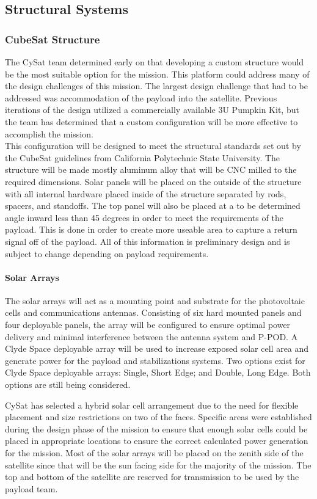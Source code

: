 \documentclass[nocover]            %
{CSLI}                       %
\begin{document}
\subsection{Structural Systems}
\subsubsection{CubeSat Structure}
The CySat team determined early on that developing a custom structure would be the most suitable option for the mission. This platform could address many of the design challenges of this mission. The largest design challenge that had to be addressed was accommodation of the payload into the satellite. Previous iterations of the design utilized a commercially available 3U Pumpkin Kit, but the team has determined that a custom configuration will be more effective to accomplish the mission.\\
\indent This configuration will be designed to meet the structural standards set out by the CubeSat guidelines from California Polytechnic State University. The structure will be made mostly aluminum alloy that will be CNC milled to the required dimensions. Solar panels will be placed on the outside of the structure with all internal hardware placed inside of the structure separated by rods, spacers, and standoffs. The top panel will also be placed at a to be determined angle inward less than 45 degrees in order to meet the requirements of the payload. This is done in order to create more useable area to capture a return signal off of the payload. All of this information is preliminary design and is subject to change depending on payload requirements.

\paragraph{Solar Arrays\\}
The solar arrays will act as a mounting point and substrate for the photovoltaic cells and communications antennas. Consisting of six hard mounted panels and four deployable panels, the array will be configured to ensure optimal power delivery and minimal interference between the antenna system and P-POD. A Clyde Space deployable array will be used to increase exposed solar cell area and generate power for the payload and stabilizations systems. Two options exist for Clyde Space deployable arrays: Single, Short Edge; and Double, Long Edge. Both options are still being considered.

CySat has selected a hybrid solar cell arrangement due to the need for flexible placement and size restrictions on two of the faces. Specific areas were established during the design phase of the mission to ensure that enough solar cells could be placed in appropriate locations to ensure the correct calculated power generation for the mission. Most of the solar arrays will be placed on the zenith side of the satellite since that will be the sun facing side for the majority of the mission. The top and bottom of the satellite are reserved for transmission to be used by the payload team.
\end{document}
